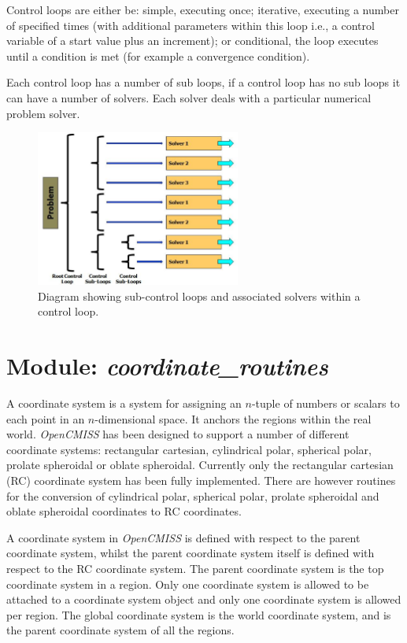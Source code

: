 Control loops are either be: simple, executing once; iterative, executing a
number of specified times (with additional parameters within this loop i.e., 
a control variable of a start value plus an increment); or conditional, the 
loop executes until a condition is met (for example a convergence condition).

Each control loop has a number of sub loops, if a control loop has no sub loops 
it can have a number of solvers. Each solver deals with a particular numerical 
problem solver.

\begin{figure}
\centering
      \includegraphics[width=0.6\textwidth]{figs/Modules/control_loops.eps}
\caption{Diagram showing sub-control loops and associated solvers within a 
control loop.}
\label{control_loops}
\end{figure}



\section{Module: \emph{coordinate\_routines}}
\label{sec:coordinateroutines}

A coordinate system is a system for assigning an $n$-tuple of numbers or
scalars to each point in an $n$-dimensional space. It anchors the regions 
within the real world. \emph{OpenCMISS} has been designed to support a number 
of different coordinate systems: rectangular cartesian, cylindrical polar, 
spherical polar, prolate spheroidal or oblate spheroidal. Currently only the 
rectangular cartesian (RC) coordinate system has been fully implemented. 
There are however routines for the conversion of cylindrical polar, spherical 
polar, prolate spheroidal and oblate spheroidal coordinates to RC coordinates.

A coordinate system in \emph{OpenCMISS} is defined with respect to the parent 
coordinate system, whilst the parent coordinate system itself is defined with 
respect to the RC coordinate system. The parent coordinate system is the top 
coordinate system in a region. Only one coordinate system is allowed to be 
attached to a coordinate system object and only one coordinate system is 
allowed per region. The global coordinate system is the world coordinate 
system, and is the parent coordinate system of all the regions. 


